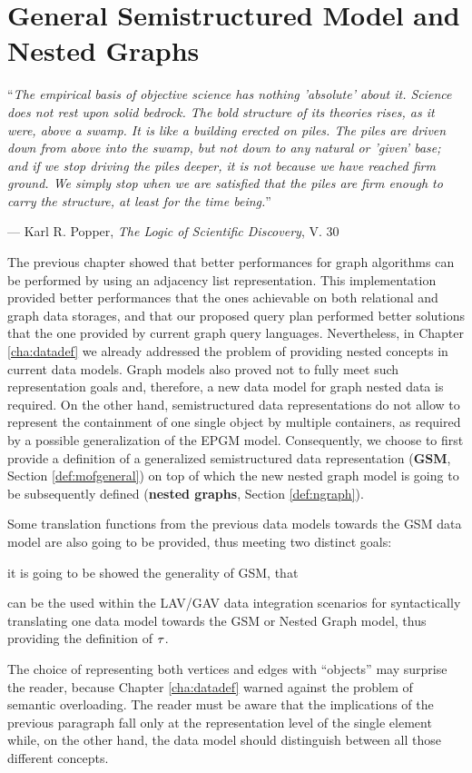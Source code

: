 \chapter{General Semistructured Model and Nested Graphs}\label{cha:graphsdef}
\epigraph{``\textit{The empirical basis of objective science has nothing 'absolute' about it. Science does not rest upon solid bedrock. The bold structure of its theories rises, as it were, above a swamp. It is like a building erected on piles. The piles are driven down from above into the swamp, but not down to any natural or 'given' base; and if we stop driving the piles deeper, it is not because we have reached firm ground. We simply stop when we are satisfied that the piles are firm enough to carry the structure, at least for the time being.}''}{--- Karl R. Popper, \textit{The Logic of Scientific Discovery}, V. 30}

The previous chapter showed that better performances for graph algorithms can be performed by using an adjacency list representation. This implementation provided better performances that the ones achievable on both relational and graph data storages, and that our proposed query plan performed better solutions that the one provided by current graph query languages. Nevertheless, in Chapter \vref{cha:datadef} we already addressed the problem of providing nested concepts in current data models. Graph models also proved not to fully meet such representation goals and, therefore, a new data model for graph nested data is required. On the other hand, semistructured data representations do not allow to represent the containment of one single object by multiple containers, as required by a possible generalization of the EPGM model. Consequently, we choose to first provide a definition of a generalized semistructured data representation (\textbf{GSM}, Section \ref{def:mofgeneral}) on top of which the new nested graph model is going to be subsequently defined (\textbf{nested graphs}, Section \ref{def:ngraph}). 

Some translation functions from the previous data models towards the GSM data model are also going to be provided, thus meeting two distinct goals: \begin{mylist}
	\item it is going to be showed the generality of GSM, that
	\item can be the used within the LAV/GAV   data integration scenarios for syntactically translating one data model towards the GSM or Nested Graph model, thus providing the definition of $\ttransl$.
\end{mylist}
The choice of representing both vertices and edges with ``objects'' may surprise the reader, because Chapter \ref{cha:datadef} warned against the problem of semantic overloading. The reader must be aware that the implications of the previous paragraph fall only at the representation level of the single element while, on the other hand, the data model should distinguish between all those different concepts.


